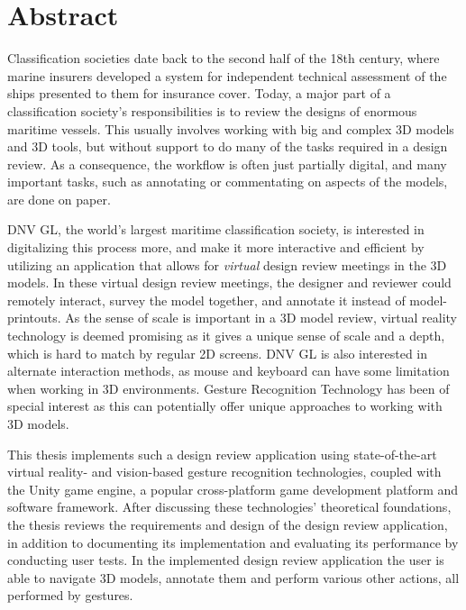 \chapter*{Abstract}       
Classification societies date back to the second half of the 18th century, where marine insurers developed a system for independent technical assessment of the ships
presented to them for insurance cover. Today, a major part of a classification society's responsibilities is to review the designs of enormous maritime
vessels. This usually involves working with big and complex 3D models and 3D tools, but without support to do many of the tasks required in a design review.
As a consequence, the workflow is often just partially digital, and many important tasks, such as annotating or commentating on aspects of the models, are done on paper.

DNV GL, the world's largest maritime classification society, is interested in digitalizing this process more, and make it more interactive and efficient by 
utilizing an application that allows for \textit{virtual} design review meetings in the 3D models. In these virtual design review meetings, 
the designer and reviewer could remotely interact, survey the model together, and annotate it instead of model-printouts.
As the sense of scale is important in a 3D model review, virtual reality technology is deemed promising as it gives a unique sense of scale
and a depth, which is hard to match by regular 2D screens. 
DNV GL is also interested in alternate interaction methods, as mouse and keyboard can have some limitation when working in 3D environments. 
Gesture Recognition Technology has been of special interest as this can potentially offer unique approaches to working with 3D models.

This thesis implements such a design review application using state-of-the-art virtual reality- and vision-based gesture recognition technologies,
coupled with the Unity game engine, a popular cross-platform game development platform and software framework. 
After discussing these technologies' theoretical foundations, the thesis
reviews the requirements and design of the design review application, in addition to documenting its implementation and evaluating its performance by conducting user tests.
In the implemented design review application the user is able to navigate 3D models, annotate them and perform various other actions, all performed by gestures. 


